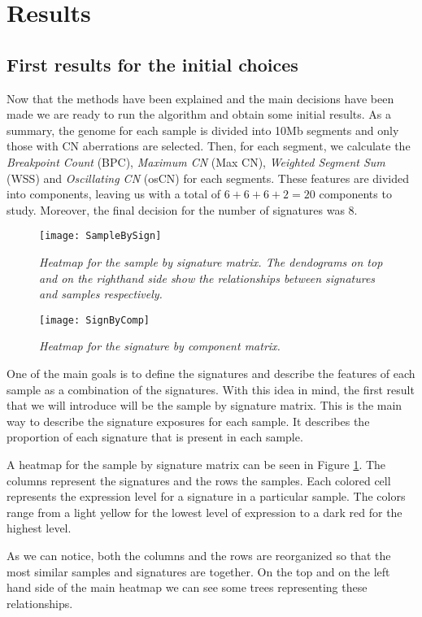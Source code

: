 \documentclass[a4paper]{article}
\begin{document}
\section{Results}
\subsection{First results for the initial choices}
Now that the methods have been explained and the main decisions have been made we are ready to run the algorithm and obtain some initial results. As a summary, the genome for each sample is divided into 10Mb segments and only those with CN aberrations are selected. Then, for each segment, we calculate the \textit{Breakpoint Count} (BPC), \textit{Maximum CN} (Max CN), \textit{Weighted Segment Sum} (WSS) and \textit{Oscillating CN} (osCN) for each segments. These features are divided into components, leaving us with a total of $6+6+6+2=20$ components to study. Moreover, the final decision for the number of signatures was 8. 

 \begin{figure}[h] 
	\centering
	\texttt{[image: SampleBySign]} 
	\caption{\textit{Heatmap for the sample by signature matrix. The dendograms on top and on the righthand side show the relationships between signatures and samples respectively.}} \label{SampleBySign}
\end{figure}
 \begin{figure}[h] 
	\centering
	\texttt{[image: SignByComp]} 
	\caption{\textit{Heatmap for the signature by component matrix.}} \label{SignByComp}
\end{figure}

One of the main goals is to define the signatures and describe the features of each sample as a combination of the signatures. With this idea in mind, the first result that we will introduce will be the sample by signature matrix. This is the main way to describe the signature exposures for each sample. It describes the proportion of each signature that is present in each sample. 

A heatmap for the sample by signature matrix can be seen in Figure \ref{SampleBySign}. The columns represent the signatures and the rows the samples. Each colored cell represents the expression level for a signature in a particular sample. The colors range from a light yellow for the lowest level of expression to a dark red for the highest level.  

As we can notice, both the columns and the rows are reorganized so that the most similar samples and signatures are together. On the top and on the left hand side of the main heatmap we can see some trees representing these relationships.
\end{document}
